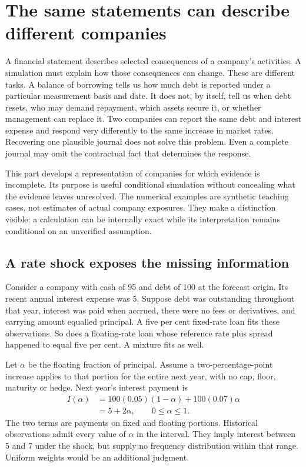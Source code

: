 \chapter[Different companies, identical statements]{The same statements can describe different companies}
\label{sim:observations}

A financial statement describes selected consequences of a company's activities. A simulation must explain how those consequences can change. These are different tasks. A balance of borrowing tells us how much debt is reported under a particular measurement basis and date. It does not, by itself, tell us when debt resets, who may demand repayment, which assets secure it, or whether management can replace it. Two companies can report the same debt and interest expense and respond very differently to the same increase in market rates. Recovering one plausible journal does not solve this problem. Even a complete journal may omit the contractual fact that determines the response.

This part develops a representation of companies for which evidence is incomplete. Its purpose is useful conditional simulation without concealing what the evidence leaves unresolved. The numerical examples are synthetic teaching cases, not estimates of actual company exposures. They make a distinction visible: a calculation can be internally exact while its interpretation remains conditional on an unverified assumption.

\section{A rate shock exposes the missing information}
Consider a company with cash of 95 and debt of 100 at the forecast origin. Its recent annual interest expense was 5. Suppose debt was outstanding throughout that year, interest was paid when accrued, there were no fees or derivatives, and carrying amount equalled principal. A five per cent fixed-rate loan fits these observations. So does a floating-rate loan whose reference rate plus spread happened to equal five per cent. A mixture fits as well.

Let $\alpha$ be the floating fraction of principal. Assume a two-percentage-point increase applies to that portion for the entire next year, with no cap, floor, maturity or hedge. Next year's interest payment is
\begin{align}
 I(\alpha)&=100(0.05)(1-\alpha)+100(0.07)\alpha\\
 &=5+2\alpha,\qquad 0\leq\alpha\leq1.\label{sim:interest-family}
\end{align}
The two terms are payments on fixed and floating portions. Historical observations admit every value of $\alpha$ in the interval. They imply interest between 5 and 7 under the shock, but supply no frequency distribution within that range. Uniform weights would be an additional judgment.

